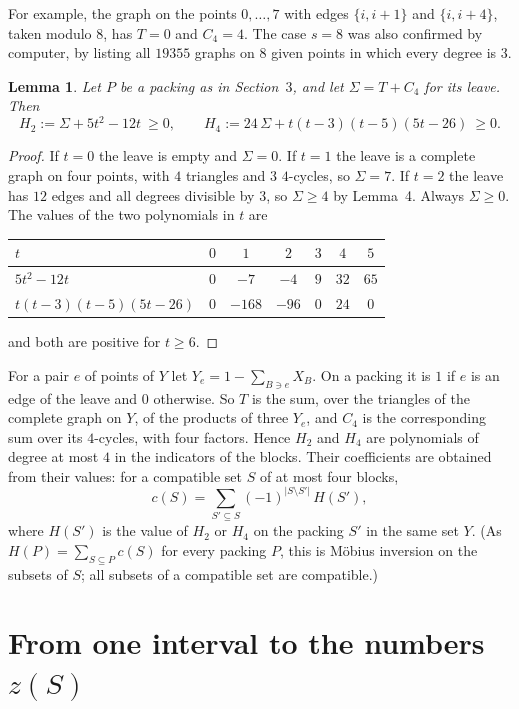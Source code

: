 \documentclass[11pt,a4paper]{article}
\newtheorem{lemma}{Lemma}
\newcommand{\abs}[1]{\lvert #1\rvert}
\begin{document}
For example, the graph on the points $0,\dots,7$ with edges $\{i,i+1\}$
and $\{i,i+4\}$, taken modulo $8$, has $T=0$ and $C_4=4$. The case $s=8$ was also confirmed by computer, by listing all
$19355$ graphs on $8$ given points in which every degree is $3$.

\begin{lemma}
Let $P$ be a packing as in Section~$3$, and let $\Sigma=T+C_4$ for its
leave. Then
\[
H_2:=\Sigma+5t^2-12t\ \ge 0,\qquad
H_4:=24\,\Sigma+t(t-3)(t-5)(5t-26)\ \ge 0 .
\]
\end{lemma}

\begin{proof}
If $t=0$ the leave is empty and $\Sigma=0$. If $t=1$ the leave is a complete
graph on four points, with $4$ triangles and $3$ $4$-cycles, so $\Sigma=7$.
If $t=2$ the leave has $12$ edges and all degrees divisible by $3$, so
$\Sigma\ge 4$ by Lemma~4. Always $\Sigma\ge 0$. The values of the two
polynomials in $t$ are
\begin{center}
\begin{tabular}{lcccccc}
\hline
$t$ & $0$ & $1$ & $2$ & $3$ & $4$ & $5$ \\
\hline
$5t^2-12t$ & $0$ & $-7$ & $-4$ & $9$ & $32$ & $65$ \\
$t(t-3)(t-5)(5t-26)$ & $0$ & $-168$ & $-96$ & $0$ & $24$ & $0$ \\
\hline
\end{tabular}
\end{center}
and both are positive for $t\ge 6$.
\end{proof}

For a pair $e$ of points of $Y$ let $Y_e=1-\sum_{B\ni e}X_B$. On a packing
it is $1$ if $e$ is an edge of the leave and $0$ otherwise. So $T$ is the
sum, over the triangles of the complete graph on $Y$, of the products of
three $Y_e$, and $C_4$ is the corresponding sum over its $4$-cycles, with
four factors. Hence $H_2$ and $H_4$ are polynomials of degree at most $4$
in the indicators of the blocks. Their coefficients are obtained from their
values: for a compatible set $S$ of at most four blocks,
\[
c(S)=\sum_{S'\subseteq S}(-1)^{\abs{S\setminus S'}}\,H(S'),
\]
where $H(S')$ is the value of $H_2$ or $H_4$ on the packing $S'$ in the
same set $Y$. (As $H(P)=\sum_{S\subseteq P}c(S)$ for every packing $P$,
this is M\"obius inversion on the subsets of $S$; all subsets of a
compatible set are compatible.)

\section{From one interval to the numbers $z(S)$}
\end{document}
